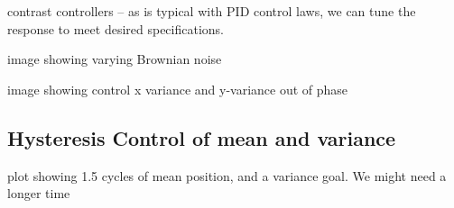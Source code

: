 contrast controllers -- as is typical with PID control laws, we can tune the response to meet desired specifications.

image showing varying Brownian noise

image showing control x variance and y-variance out of phase


\subsection{Hysteresis Control of mean and variance}

plot showing 1.5 cycles of mean position, and a variance goal.  We might need a longer time





